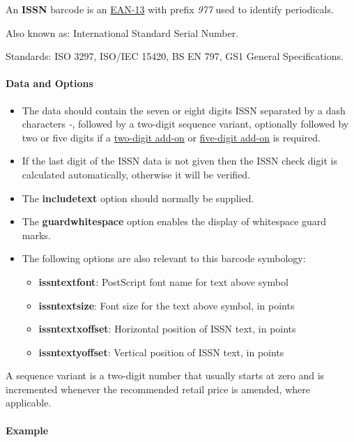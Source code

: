 An \textbf{ISSN} barcode is an \protect\hyperlink{ean-13}{EAN-13} with
prefix \emph{977} used to identify periodicals.

Also known as: International Standard Serial Number.

Standards: ISO 3297, ISO/IEC 15420, BS EN 797, GS1 General
Specifications.

\hypertarget{data-and-options-6}{%
\paragraph{Data and Options}\label{data-and-options-6}}

\begin{itemize}
\tightlist
\item
  The data should contain the seven or eight digits ISSN separated by a
  dash characters \emph{-}, followed by a two-digit sequence variant,
  optionally followed by two or five digits if a
  \protect\hyperlink{ean-2}{two-digit add-on} or
  \protect\hyperlink{ean-5}{five-digit add-on} is required.
\item
  If the last digit of the ISSN data is not given then the ISSN check
  digit is calculated automatically, otherwise it will be verified.
\item
  The \textbf{includetext} option should normally be supplied.
\item
  The \textbf{guardwhitespace} option enables the display of whitespace
  guard marks.
\item
  The following options are also relevant to this barcode symbology:

  \begin{itemize}
  \tightlist
  \item
    \textbf{issntextfont}: PostScript font name for text above symbol
  \item
    \textbf{issntextsize}: Font size for the text above symbol, in
    points
  \item
    \textbf{issntextxoffset}: Horizontal position of ISSN text, in
    points
  \item
    \textbf{issntextyoffset}: Vertical position of ISSN text, in points
  \end{itemize}
\end{itemize}

A sequence variant is a two-digit number that usually starts at zero and
is incremented whenever the recommended retail price is amended, where
applicable.

\hypertarget{example}{%
\paragraph{Example}\label{example}}

